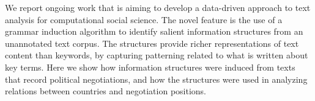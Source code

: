 We report ongoing work that is aiming to develop a data-driven approach to text analysis for computational social science. The novel feature is the use of a grammar induction algorithm to identify salient information structures from an unannotated text corpus. The structures provide richer representations of text content than keywords, by capturing patterning related to what is written about key terms. Here we show how information structures were induced from texts that record political negotiations, and how the structures were used in analyzing relations between countries and negotiation positions.
